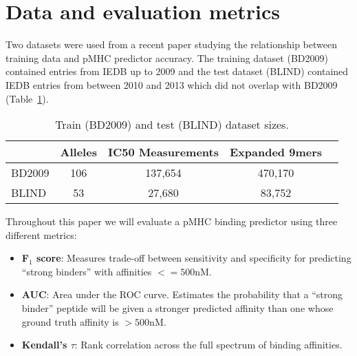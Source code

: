 \section{Data and evaluation metrics}

Two datasets were used from a recent paper studying the relationship between training data and pMHC predictor accuracy\cite{Kim_2014}. The training dataset (BD2009) contained entries from IEDB\cite{Salimi_2012} up to 2009 and the test dataset (BLIND) contained IEDB entries from between 2010 and 2013 which did not overlap with BD2009 (Table~\ref{tab:datasets}).

\begin{table}[h!]
\centering
\begin{tabular}{l||cccc}
\toprule
{} & Alleles &  IC50 Measurements & Expanded 9mers \\
\midrule
BD2009 &     106 &                           137,654 &        470,170 \\
BLIND  &      53 &                           27,680 &         83,752 \\
\bottomrule
\end{tabular}
\caption{Train (BD2009) and test (BLIND) dataset sizes.}
\label{tab:datasets}
\end{table}

Throughout this paper we will evaluate a pMHC binding predictor using three different metrics:

\begin{itemize}
\item {\bf F$_1$ score}: Measures trade-off between sensitivity and specificity for predicting ``strong binders'' with affinities $<= 500$nM. 
\item {\bf AUC}: Area under the ROC curve. Estimates the probability that a ``strong binder'' peptide will be given a stronger predicted affinity than one whose ground truth affinity is $>500$nM. 
\item {\bf Kendall's $\tau$}: Rank correlation across the full spectrum of binding affinities.
\end{itemize}

